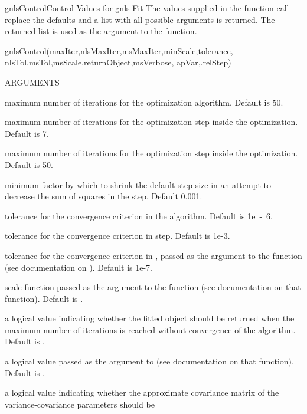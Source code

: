 \documentclass[pdftex]{article} \usepackage{url,graphicx}
\begin{document}
\begin{Helpfile}{gnlsControl}{Control Values for gnls Fit}
The values supplied in the function call replace the defaults and a
list with all possible arguments is returned. The returned list is
used as the  argument to the  function.
\begin{Example}
gnlsControl(maxIter,nlsMaxIter,msMaxIter,minScale,tolerance, 
            nlsTol,msTol,msScale,returnObject,msVerbose, 
            apVar,.relStep) 
\end{Example}
\begin{Argument}{ARGUMENTS}
\item[\Co{maxIter:}]
maximum number of iterations for the 
optimization algorithm. Default is 50.
\item[\Co{nlsMaxIter:}]
maximum number of iterations
for the  optimization step inside the 
optimization. Default is 7.
\item[\Co{msMaxIter:}]
maximum number of iterations
for the  optimization step inside the 
optimization. Default is 50.
\item[\Co{minScale:}]
minimum factor by which to shrink the default step size
in an attempt to decrease the sum of squares in the  step.
Default 0.001.
\item[\Co{tolerance:}]
tolerance for the convergence criterion in the
 algorithm. Default is 1e~-~6.
\item[\Co{nlsTol:}]
tolerance for the convergence criterion in 
step. Default is 1e-3.
\item[\Co{msTol:}]
tolerance for the convergence criterion in ,
passed as the  argument to the function (see
documentation on ). Default is 1e-7.
\item[\Co{msScale:}]
scale function passed as the  argument to
the  function (see documentation on that function). Default
is .
\item[\Co{returnObject:}]
a logical value indicating whether the fitted
object should be returned when the maximum number of iterations is
reached without convergence of the algorithm. Default is
.
\item[\Co{msVerbose:}]
a logical value passed as the  argument to
 (see documentation on that function). Default is
.
\item[\Co{apVar:}]
a logical value indicating whether the approximate
covariance matrix of the variance-covariance parameters should be

\end{Argument}
\end{Helpfile}
\end{document}
